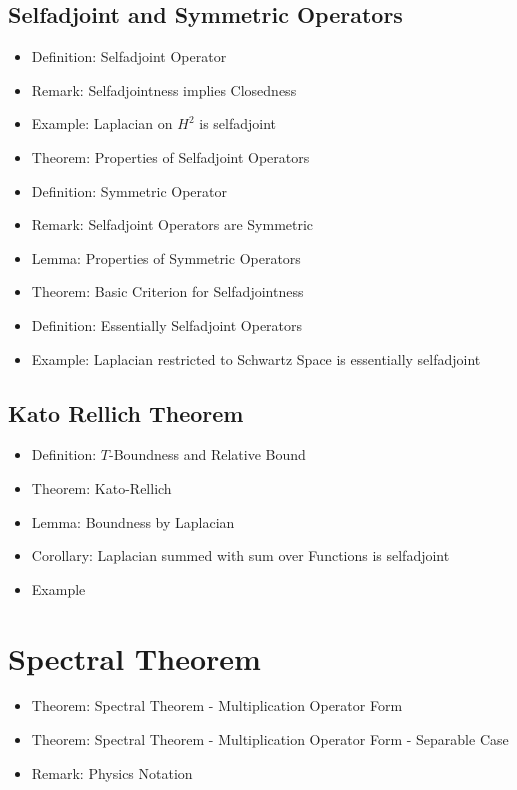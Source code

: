 \documentclass[8pt,twocolumn]{article}
\begin{document}
    \subsection{Selfadjoint and Symmetric Operators} %
    \label{sub:selfadjoint_and_symmetric_operators}
      \begin{itemize}
        \item Definition: Selfadjoint Operator
        \item Remark: Selfadjointness implies Closedness
        \item Example: Laplacian on $H^2$ is selfadjoint
        \item Theorem: Properties of Selfadjoint Operators
        \item Definition: Symmetric Operator
        \item Remark: Selfadjoint Operators are Symmetric
        \item Lemma: Properties of Symmetric Operators
        \item Theorem: Basic Criterion for Selfadjointness
        \item Definition: Essentially Selfadjoint Operators
        \item Example: Laplacian restricted to Schwartz Space is essentially selfadjoint
      \end{itemize}

    \subsection{Kato Rellich Theorem} %
    \label{sub:kato_rellich_theorem}
      \begin{itemize}
        \item Definition: $T$-Boundness and Relative Bound
        \item Theorem: Kato-Rellich
        \item Lemma: Boundness by Laplacian
        \item Corollary: Laplacian summed with sum over Functions is selfadjoint
        \item Example
      \end{itemize}

  \section{Spectral Theorem} %
  \label{sec:spectral_theorem}
    \begin{itemize}
      \item Theorem: Spectral Theorem - Multiplication Operator Form
      \item Theorem: Spectral Theorem - Multiplication Operator Form - Separable Case
      \item Remark: Physics Notation
    \end{itemize}
\end{document}
